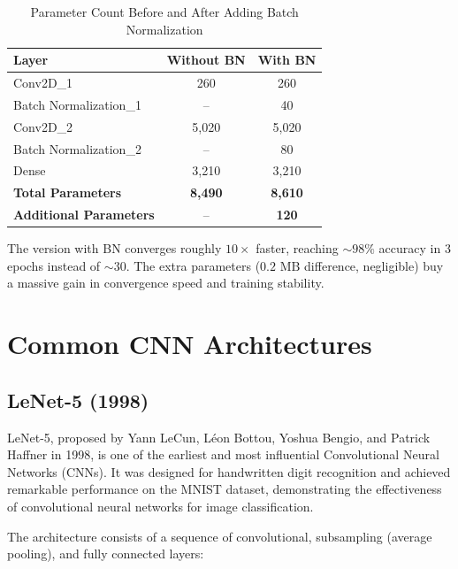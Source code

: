 \begin{table}[htbp]
\centering
\caption{Parameter Count Before and After Adding Batch Normalization}
\label{tab}
\begin{tabular}{lcc}
\toprule
\textbf{Layer} & \textbf{Without BN} & \textbf{With BN} \\
\midrule
Conv2D\_1 & 260 & 260 \\
Batch Normalization\_1 & -- & 40 \\
Conv2D\_2 & 5,020 & 5,020 \\
Batch Normalization\_2 & -- & 80 \\
Dense & 3,210 & 3,210 \\
\midrule
\textbf{Total Parameters} & \textbf{8,490} & \textbf{8,610} \\
\textbf{Additional Parameters} & -- & \textbf{120} \\
\bottomrule
\end{tabular}
\end{table}

The version with BN converges roughly $10\times$ faster, reaching $\sim 98\%$ accuracy in 3 epochs instead of $\sim 30$. The extra parameters ($0.2\text{ MB}$ difference, negligible) buy a massive gain in convergence speed and training stability.

\section{Common CNN Architectures}

\subsection{LeNet-5 (1998)}

LeNet-5, proposed by Yann LeCun, Léon Bottou, Yoshua Bengio, and Patrick Haffner in 1998, is one of the earliest and most influential Convolutional Neural Networks (CNNs). It was designed for handwritten digit recognition and achieved remarkable performance on the MNIST dataset, demonstrating the effectiveness of convolutional neural networks for image classification.

The architecture consists of a sequence of convolutional, subsampling (average pooling), and fully connected layers:

